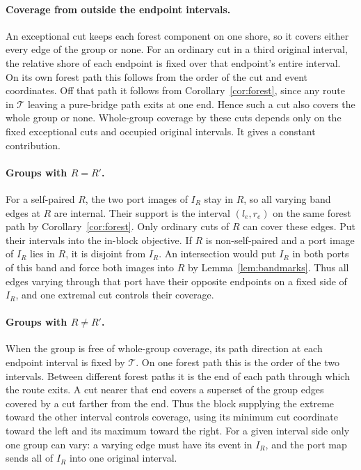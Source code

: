 \documentclass[10pt,letterpaper]{article}
\newcommand{\tree}{\mathcal T}
\begin{document}
\paragraph{Coverage from outside the endpoint intervals.}
An exceptional cut keeps each forest component on one shore, so it covers either every edge of the group or none. For an ordinary cut in a third original interval, the relative shore of each endpoint is fixed over that endpoint's entire interval. On its own forest path this follows from the order of the cut and event coordinates. Off that path it follows from Corollary~\ref{cor:forest}, since any route in \(\tree\) leaving a pure-bridge path exits at one end. Hence such a cut also covers the whole group or none. Whole-group coverage by these cuts depends only on the fixed exceptional cuts and occupied original intervals. It gives a constant contribution.

\paragraph{Groups with \(R=R'\).}
For a self-paired \(R\), the two port images of \(I_R\) stay in \(R\), so all varying band edges at \(R\) are internal. Their support is the interval \((l_e,r_e)\) on the same forest path by Corollary~\ref{cor:forest}. Only ordinary cuts of \(R\) can cover these edges. Put their intervals into the in-block objective. If \(R\) is non-self-paired and a port image of \(I_R\) lies in \(R\), it is disjoint from \(I_R\). An intersection would put \(I_R\) in both ports of this band and force both images into \(R\) by Lemma~\ref{lem:bandmarks}. Thus all edges varying through that port have their opposite endpoints on a fixed side of \(I_R\), and one extremal cut controls their coverage.

\paragraph{Groups with \(R\ne R'\).}
When the group is free of whole-group coverage, its path direction at each endpoint interval is fixed by \(\tree\). On one forest path this is the order of the two intervals. Between different forest paths it is the end of each path through which the route exits. A cut nearer that end covers a superset of the group edges covered by a cut farther from the end. Thus the block supplying the extreme toward the other interval controls coverage, using its minimum cut coordinate toward the left and its maximum toward the right. For a given interval side only one group can vary: a varying edge must have its event in \(I_R\), and the port map sends all of \(I_R\) into one original interval.
\end{document}
